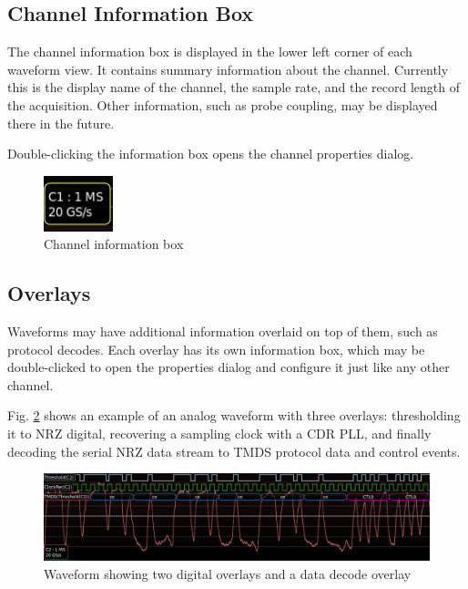\documentclass[11pt]{article}
\begin{document}
\subsection{Channel Information Box}

The channel information box is displayed in the lower left corner of each waveform view. It contains summary
information about the channel. Currently this is the display name of the channel, the sample rate, and the record
length of the acquisition. Other information, such as probe coupling, may be displayed there in the future.

Double-clicking the information box opens the channel properties dialog.

\begin{figure}[H]
\centering
\includegraphics[width=2cm]{images/channel-infobox.png}
\caption{Channel information box}
\label{channel-infobox}
\end{figure}

\subsection{Overlays}

Waveforms may have additional information overlaid on top of them, such as protocol decodes. Each overlay has its own
information box, which may be double-clicked to open the properties dialog and configure it just like any other
channel.

Fig. \ref{overlays} shows
an example of an analog waveform with three overlays: thresholding it to NRZ digital, recovering a sampling
clock with a CDR PLL, and finally decoding the serial NRZ data stream to TMDS protocol data and control events.

\begin{figure}[H]
\centering
\includegraphics[width=14cm]{images/overlays.png}
\caption{Waveform showing two digital overlays and a data decode overlay}
\label{overlays}
\end{figure}
\end{document}
